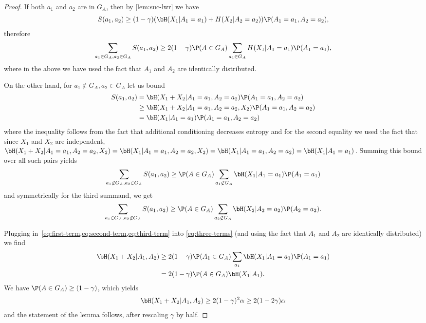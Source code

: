 \documentclass[11pt]{article}
\begin{document}
\begin{proof}
	If both $a_1$ and $a_2$ are in $G_A$, then by \cref{lem:suc-lwr} we have
	\begin{equation*}
		S(a_1, a_2) \geq (1 - \gamma) (\bH(X_1 | A_1 = a_1) + H(X_2 | A_2 = a_2)) \P(A_1 = a_1, A_2 = a_2),
	\end{equation*}
	therefore
	\begin{equation}
		\sum_{a_1 \in G_A, a_2 \in G_A} S(a_1, a_2) \geq 2 (1 - \gamma) \P(A \in G_A) \sum_{a_1 \in G_A} H(X_1 | A_1 = a_1) \P(A_1 = a_1),
		\label{eq:first-term}
	\end{equation}
	where in the above we have used the fact that $A_1$ and $A_2$ are identically distributed.
	
	On the other hand, for $a_1 \not\in G_A, a_2 \in G_A$ let us  bound
	\begin{align*}
		S(a_1, a_2) & = \bH(X_1 + X_2 | A_1 = a_1, A_2 = a_2) \P(A_1 = a_1, A_2 = a_2) \\
		& \geq \bH(X_1 + X_2 | A_1 = a_1, A_2 = a_2, X_2) \P(A_1 = a_1, A_2 = a_2) \\
		& = \bH(X_1 | A_1 = a_1) \P(A_1 = a_1, A_2 = a_2)
	\end{align*}
	where the inequality follows from the fact that additional conditioning decreases entropy and for the second equality we  used the fact that since $X_1$ and $X_2$ are independent, $\bH(X_1 + X_2 | A_1 = a_1, A_2 = a_2, X_2)= \bH(X_1 | A_1 = a_1, A_2 = a_2, X_2)= \bH(X_1 | A_1 = a_1, A_2 = a_2)=\bH(X_1 | A_1 = a_1)$.
	Summing this bound over all such pairs yields
	\begin{equation}
		\sum_{a_1 \not\in G_A, a_2 \in G_A} S(a_1, a_2) \geq \P(A \in G_A) \sum_{a_1\not\in G_A} \bH(X_1 | A_1 = a_1)\P(A_1 = a_1)
		\label{eq:second-term}
	\end{equation}
	and symmetrically for the third summand, we get
	\begin{equation}
		\sum_{a_1 \in G_A, a_2 \not\in G_A} S(a_1, a_2) \geq \P(A \in G_A) \sum_{a_2\not\in G_A} \bH(X_2 | A_2 = a_2)\P(A_2 = a_2).
		\label{eq:third-term}
	\end{equation}
	
	Plugging in~\cref{eq:first-term,eq:second-term,eq:third-term}  into \cref{eq:three-terms} (and using the fact that $A_1$ and $A_2$ are identically distributed) we find
	\begin{align*}
		\bH(X_1 + X_2 | A_1, A_2) & \geq 2(1 - \gamma) \P(A_1 \in G_A)\sum_{a_1} \bH(X_1 | A_1 = a_1)\P(A_1 = a_1) \\
		& = 2 (1 - \gamma)\P(A \in G_A) \bH(X_1 | A_1).
	\end{align*}
	We have $\P(A \in G_A) \geq (1 - \gamma)$, which yields
	\begin{equation*}
		\bH(X_1 + X_2 | A_1, A_2) \geq 2(1 - \gamma)^2 \alpha  \geq 2(1 - 2\gamma) \alpha
	\end{equation*}
	and the statement of the lemma follows, after rescaling $\gamma$ by half.
\end{proof}
\end{document}
